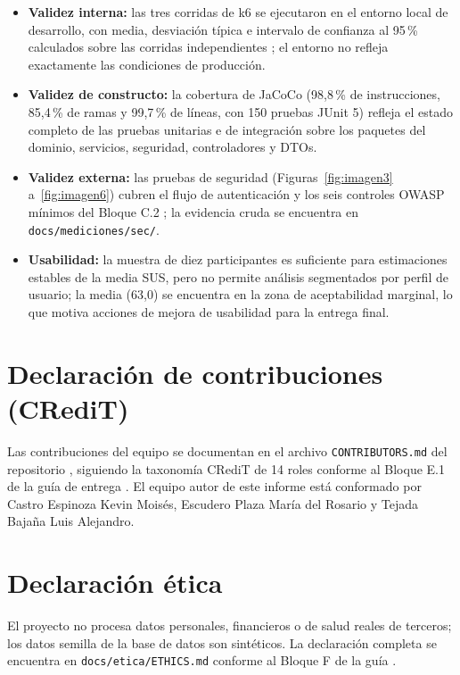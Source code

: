 \documentclass[12pt]{article}
\begin{document}
\begin{itemize}
    \item \textbf{Validez interna:} las tres corridas de k6 se ejecutaron en el entorno
    local de desarrollo, con media, desviación típica e intervalo de confianza al 95\,\%
    calculados sobre las corridas independientes \cite{uteq2026guia}; el entorno no refleja
    exactamente las condiciones de producción.
    \item \textbf{Validez de constructo:} la cobertura de JaCoCo (98{,}8\,\% de instrucciones,
    85{,}4\,\% de ramas y 99{,}7\,\% de líneas, con 150 pruebas JUnit 5) refleja el estado
    completo de las pruebas unitarias e de integración sobre los paquetes del dominio, servicios,
    seguridad, controladores y DTOs.
    \item \textbf{Validez externa:} las pruebas de seguridad (Figuras~\ref{fig:imagen3}
    a~\ref{fig:imagen6}) cubren el flujo de autenticación y los seis controles OWASP mínimos del
    Bloque C.2 \cite{owasp2021,uteq2026guia}; la evidencia cruda se encuentra en
    \texttt{docs/mediciones/sec/}.
    \item \textbf{Usabilidad:} la muestra de diez participantes es suficiente para estimaciones
    estables de la media SUS, pero no permite análisis segmentados por perfil de usuario; la media
    (63{,}0) se encuentra en la zona de aceptabilidad marginal, lo que motiva acciones de mejora
    de usabilidad para la entrega final.
\end{itemize}

\section*{Declaración de contribuciones (CRediT)}

Las contribuciones del equipo se documentan en el archivo \texttt{CONTRIBUTORS.md} del
repositorio \cite{sgroas_repo}, siguiendo la taxonomía CRediT de 14 roles conforme al
Bloque E.1 de la guía de entrega \cite{uteq2026guia}. El equipo autor de este informe está
conformado por Castro Espinoza Kevin Moisés, Escudero Plaza María del Rosario y Tejada Bajaña
Luis Alejandro.

\section*{Declaración ética}

El proyecto no procesa datos personales, financieros o de salud reales de terceros; los datos
semilla de la base de datos son sintéticos. La declaración completa se encuentra en
\texttt{docs/etica/ETHICS.md} conforme al Bloque F de la guía \cite{uteq2026guia}.

\printbibliography[title={Referencias}]
\end{document}
